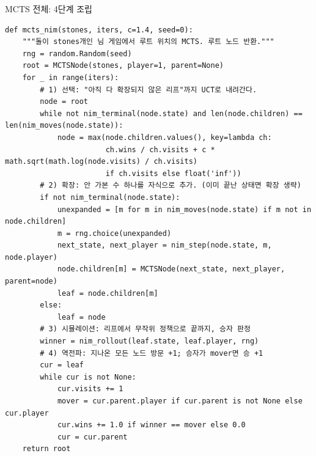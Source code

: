 \begin{frame}[fragile]{MCTS 전체: 4단계 조립}
\begin{lstlisting}
def mcts_nim(stones, iters, c=1.4, seed=0):
    """돌이 stones개인 님 게임에서 루트 위치의 MCTS. 루트 노드 반환."""
    rng = random.Random(seed)
    root = MCTSNode(stones, player=1, parent=None)
    for _ in range(iters):
        # 1) 선택: "아직 다 확장되지 않은 리프"까지 UCT로 내려간다.
        node = root
        while not nim_terminal(node.state) and len(node.children) == len(nim_moves(node.state)):
            node = max(node.children.values(), key=lambda ch:
                       ch.wins / ch.visits + c * math.sqrt(math.log(node.visits) / ch.visits)
                       if ch.visits else float('inf'))
        # 2) 확장: 안 가본 수 하나를 자식으로 추가. (이미 끝난 상태면 확장 생략)
        if not nim_terminal(node.state):
            unexpanded = [m for m in nim_moves(node.state) if m not in node.children]
            m = rng.choice(unexpanded)
            next_state, next_player = nim_step(node.state, m, node.player)
            node.children[m] = MCTSNode(next_state, next_player, parent=node)
            leaf = node.children[m]
        else:
            leaf = node
        # 3) 시뮬레이션: 리프에서 무작위 정책으로 끝까지, 승자 판정
        winner = nim_rollout(leaf.state, leaf.player, rng)
        # 4) 역전파: 지나온 모든 노드 방문 +1; 승자가 mover면 승 +1
        cur = leaf
        while cur is not None:
            cur.visits += 1
            mover = cur.parent.player if cur.parent is not None else cur.player
            cur.wins += 1.0 if winner == mover else 0.0
            cur = cur.parent
    return root
\end{lstlisting}
\end{frame}
